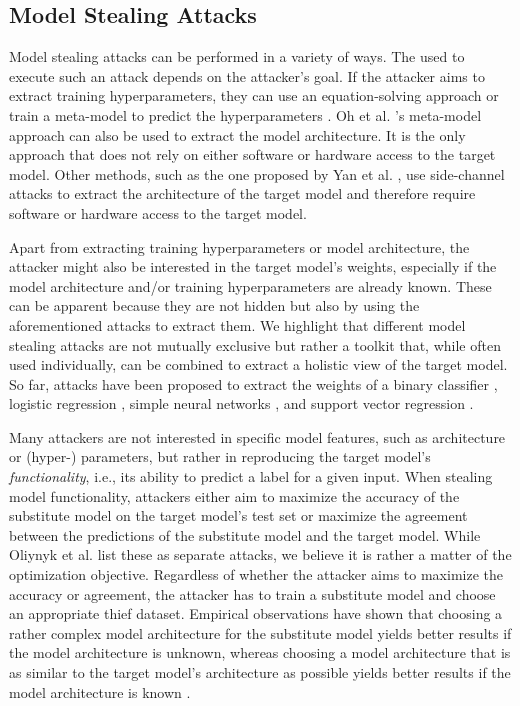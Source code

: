 \subsection{Model Stealing Attacks}
\label{sec:ModelStealing:Attacks}
Model stealing attacks can be performed in a variety of ways. The used to execute such an attack depends on the attacker's goal. If the attacker
aims to extract training hyperparameters, they can use an equation-solving approach \cite{wang2018stealing} or train a meta-model to predict the hyperparameters
\cite{oh2019towards}. Oh et al. 's meta-model approach can also be used to extract the model architecture. It is the only approach that does not rely on either
software or hardware access to the target model. Other methods, such as the one proposed by Yan et al. \cite{yan2020cache}, use side-channel attacks to extract
the architecture of the target model and therefore require software or hardware access to the target model. \par
Apart from extracting training hyperparameters or model architecture, the attacker might also be interested in the target model's weights, especially if the model
architecture and/or training hyperparameters are already known. These can be apparent because they are not hidden but also by using the 
aforementioned attacks to extract them. We highlight that different model stealing attacks are not mutually exclusive but rather a toolkit that,
while often used individually, can be combined to extract a holistic view of the target model. So far, attacks have been proposed to extract the weights of a binary classifier
\cite{lowd2005adversarial}, logistic regression \cite{tramer2016stealing}, simple neural networks \cite{tramer2016stealing}, and support vector regression \cite{reith2019efficiently}. \par
Many attackers are not interested in specific model features, such as architecture or (hyper-) parameters, but rather in reproducing the target model's \textit{functionality}, i.e.,
its ability to predict a label for a given input. When stealing model functionality, attackers either aim to maximize the accuracy of the substitute model on the target model's
test set or maximize the agreement between the predictions of the substitute model and the target model. While Oliynyk et al. list these as separate attacks, we believe it is
rather a matter of the optimization objective. Regardless of whether the attacker aims to maximize the accuracy or agreement, the attacker has to train a substitute model
and choose an appropriate thief dataset. Empirical observations have shown that choosing a rather complex model architecture for the substitute model yields better results if the
model architecture is unknown, whereas choosing a model architecture that is as similar to the target model's architecture as possible yields better results if the model architecture
is known \parencite{orekondy2019knockoff,pal2020activethief}. \par

